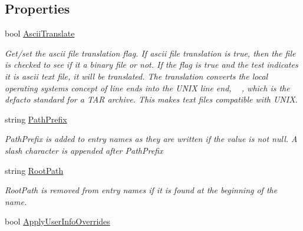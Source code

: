 \subsection*{Properties}
\begin{DoxyCompactItemize}
\item 
bool \hyperlink{class_i_c_sharp_code_1_1_sharp_zip_lib_1_1_tar_1_1_tar_archive_a67f9d3a698907b28218d9e0f97edfb9d}{Ascii\+Translate}
\begin{DoxyCompactList}\small\item\em Get/set the ascii file translation flag. If ascii file translation is true, then the file is checked to see if it a binary file or not. If the flag is true and the test indicates it is ascii text file, it will be translated. The translation converts the local operating system\textquotesingle{}s concept of line ends into the U\+N\+IX line end, \textquotesingle{}~\newline
\textquotesingle{}, which is the defacto standard for a T\+AR archive. This makes text files compatible with U\+N\+IX. \end{DoxyCompactList}\item 
string \hyperlink{class_i_c_sharp_code_1_1_sharp_zip_lib_1_1_tar_1_1_tar_archive_a3015fccbee20f9e44ef632f37b5a3c52}{Path\+Prefix}
\begin{DoxyCompactList}\small\item\em Path\+Prefix is added to entry names as they are written if the value is not null. A slash character is appended after Path\+Prefix \end{DoxyCompactList}\item 
string \hyperlink{class_i_c_sharp_code_1_1_sharp_zip_lib_1_1_tar_1_1_tar_archive_a1539407d1004b454d4505c84609e8142}{Root\+Path}
\begin{DoxyCompactList}\small\item\em Root\+Path is removed from entry names if it is found at the beginning of the name. \end{DoxyCompactList}\item 
bool \hyperlink{class_i_c_sharp_code_1_1_sharp_zip_lib_1_1_tar_1_1_tar_archive_a94d90eb52245f63a5ad06fb0289104ff}{Apply\+User\+Info\+Overrides}

\end{DoxyCompactItemize}
